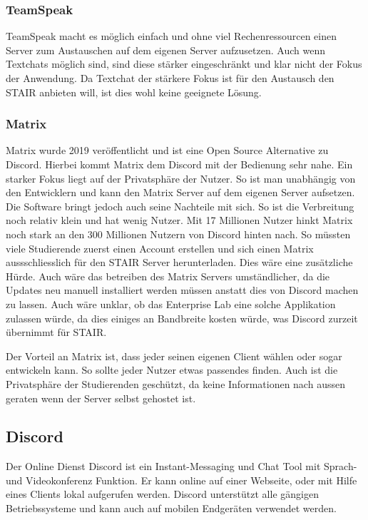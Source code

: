 \documentclass[a4paper, table]{article}
\begin{document}
\subsubsection*{TeamSpeak}

TeamSpeak macht es möglich einfach und ohne viel Rechenressourcen einen Server zum Austauschen auf dem eigenen Server aufzusetzen.
Auch wenn Textchats möglich sind, sind diese stärker eingeschränkt und klar nicht der Fokus der Anwendung.
Da Textchat der stärkere Fokus ist für den Austausch den STAIR anbieten will,
ist dies wohl keine geeignete Lösung.

\subsubsection*{Matrix}

Matrix wurde 2019 veröffentlicht und ist eine Open Source Alternative zu Discord.
Hierbei kommt Matrix dem Discord mit der Bedienung sehr nahe.
Ein starker Fokus liegt auf der Privatsphäre der Nutzer.
So ist man unabhängig von den Entwicklern und kann den Matrix Server auf dem eigenen Server aufsetzen.
Die Software bringt jedoch auch seine Nachteile mit sich.
So ist die Verbreitung noch relativ klein und hat wenig Nutzer.
Mit 17 Millionen Nutzer  hinkt Matrix noch stark an den 300 Millionen Nutzern von Discord hinten nach. 
So müssten viele Studierende zuerst einen Account erstellen und sich einen Matrix aussschliesslich für den STAIR Server herunterladen. Dies wäre eine zusätzliche Hürde.
Auch wäre das betreiben des Matrix Servers umständlicher, da die Updates neu manuell installiert werden müssen anstatt dies von Discord machen zu lassen.
Auch wäre unklar, ob das Enterprise Lab eine solche Applikation zulassen würde, da dies einiges an Bandbreite kosten würde, was Discord zurzeit übernimmt für STAIR.

Der Vorteil an Matrix ist, dass jeder seinen eigenen Client wählen oder sogar entwickeln kann. 
So sollte jeder Nutzer etwas passendes finden.
Auch ist die Privatsphäre der Studierenden geschützt, da keine Informationen nach aussen geraten wenn der Server selbst gehostet ist.

\subsection{Discord}
Der Online Dienst Discord ist ein Instant-Messaging und Chat Tool mit Sprach- und Videokonferenz Funktion.
Er kann online auf einer Webseite, oder mit Hilfe eines Clients lokal aufgerufen werden.
Discord unterst\"utzt alle g\"angigen Betriebssysteme und kann auch auf mobilen Endger\"aten verwendet werden.
\end{document}
